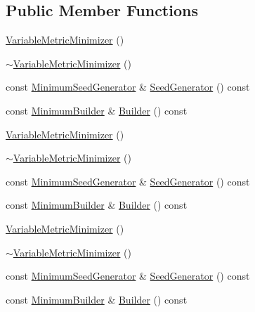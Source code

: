 \subsection*{Public Member Functions}
\begin{DoxyCompactItemize}
\item 
\mbox{\hyperlink{classROOT_1_1Minuit2_1_1VariableMetricMinimizer_a441dd894af1f9c01bd60d560260ee585}{Variable\+Metric\+Minimizer}} ()
\item 
\mbox{\hyperlink{classROOT_1_1Minuit2_1_1VariableMetricMinimizer_a2ccf4342c441f82eb4f57009ae69196e}{$\sim$\+Variable\+Metric\+Minimizer}} ()
\item 
const \mbox{\hyperlink{classROOT_1_1Minuit2_1_1MinimumSeedGenerator}{Minimum\+Seed\+Generator}} \& \mbox{\hyperlink{classROOT_1_1Minuit2_1_1VariableMetricMinimizer_a8ac2123142283dd05611842236caeadb}{Seed\+Generator}} () const
\item 
const \mbox{\hyperlink{classROOT_1_1Minuit2_1_1MinimumBuilder}{Minimum\+Builder}} \& \mbox{\hyperlink{classROOT_1_1Minuit2_1_1VariableMetricMinimizer_aa31a52e431960a91acf0b9c2997b397b}{Builder}} () const
\item 
\mbox{\hyperlink{classROOT_1_1Minuit2_1_1VariableMetricMinimizer_a441dd894af1f9c01bd60d560260ee585}{Variable\+Metric\+Minimizer}} ()
\item 
\mbox{\hyperlink{classROOT_1_1Minuit2_1_1VariableMetricMinimizer_a2ccf4342c441f82eb4f57009ae69196e}{$\sim$\+Variable\+Metric\+Minimizer}} ()
\item 
const \mbox{\hyperlink{classROOT_1_1Minuit2_1_1MinimumSeedGenerator}{Minimum\+Seed\+Generator}} \& \mbox{\hyperlink{classROOT_1_1Minuit2_1_1VariableMetricMinimizer_a8ac2123142283dd05611842236caeadb}{Seed\+Generator}} () const
\item 
const \mbox{\hyperlink{classROOT_1_1Minuit2_1_1MinimumBuilder}{Minimum\+Builder}} \& \mbox{\hyperlink{classROOT_1_1Minuit2_1_1VariableMetricMinimizer_aa31a52e431960a91acf0b9c2997b397b}{Builder}} () const
\item 
\mbox{\hyperlink{classROOT_1_1Minuit2_1_1VariableMetricMinimizer_a441dd894af1f9c01bd60d560260ee585}{Variable\+Metric\+Minimizer}} ()
\item 
\mbox{\hyperlink{classROOT_1_1Minuit2_1_1VariableMetricMinimizer_a2ccf4342c441f82eb4f57009ae69196e}{$\sim$\+Variable\+Metric\+Minimizer}} ()
\item 
const \mbox{\hyperlink{classROOT_1_1Minuit2_1_1MinimumSeedGenerator}{Minimum\+Seed\+Generator}} \& \mbox{\hyperlink{classROOT_1_1Minuit2_1_1VariableMetricMinimizer_a8ac2123142283dd05611842236caeadb}{Seed\+Generator}} () const
\item 
const \mbox{\hyperlink{classROOT_1_1Minuit2_1_1MinimumBuilder}{Minimum\+Builder}} \& \mbox{\hyperlink{classROOT_1_1Minuit2_1_1VariableMetricMinimizer_aa31a52e431960a91acf0b9c2997b397b}{Builder}} () const
\end{DoxyCompactItemize}


